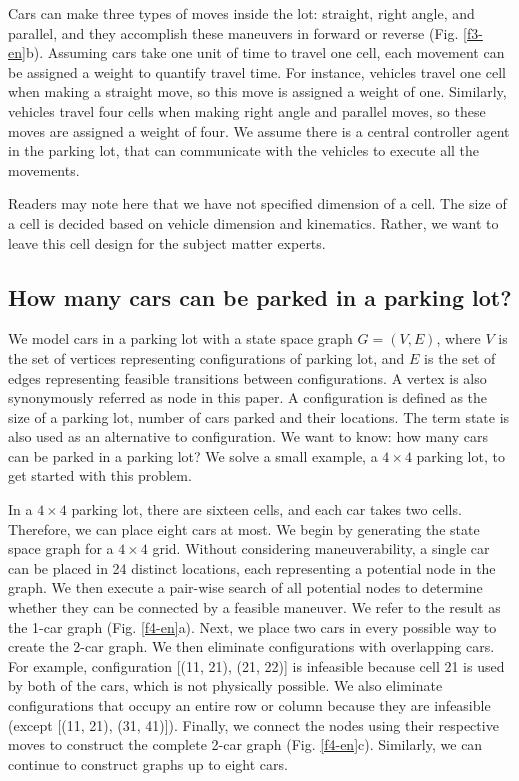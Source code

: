 Cars can make three types of moves inside the lot: straight, right angle, and parallel, and they accomplish these maneuvers in forward or reverse (Fig. \ref{f3-en}b). Assuming cars take one unit of time to travel one cell, each movement can be assigned a weight to quantify travel time. For instance, vehicles travel one cell when making a straight move, so this move is assigned a weight of one. Similarly, vehicles travel four cells when making right angle and parallel moves, so these moves are assigned a weight of four. We assume there is a central controller agent in the parking lot, that can communicate with the vehicles to execute all the movements.

Readers may note here that we have not specified dimension of a cell. The size of a cell is decided based on vehicle dimension and kinematics. Rather, we want to leave this cell design for the subject matter experts.

\subsection{How many cars can be parked in a parking lot?}

We model cars in a parking lot with a state space graph $G = (V, E)$, where $V$ is the set of vertices representing configurations of parking lot, and $E$ is the set of edges representing feasible transitions between configurations. A vertex is also synonymously referred as node in this paper. A configuration is defined as the size of a parking lot, number of cars parked and their locations. The term state is also used as an alternative to configuration. We want to know: how many cars can be parked in a parking lot? We solve a small example, a $4 \times 4$ parking lot, to get started with this problem.

In a $4 \times 4$ parking lot, there are sixteen cells, and each car takes two cells. Therefore, we can place eight cars at most. We begin by generating the state space graph for a $4 \times 4$ grid. Without considering maneuverability, a single car can be placed in 24 distinct locations, each representing a potential node in the graph. We then execute a pair-wise search of all potential nodes to determine whether they can be connected by a feasible maneuver. We refer to the result as the 1-car graph (Fig. \ref{f4-en}a). Next, we place two cars in every possible way to create the 2-car graph. We then eliminate configurations with overlapping cars. For example, configuration [(11, 21), (21, 22)] is infeasible because cell 21 is used by both of the cars, which is not physically possible. We also eliminate configurations that occupy an entire row or column because they are infeasible (except [(11, 21), (31, 41)]). Finally, we connect the nodes using their respective moves to construct the complete 2-car graph (Fig. \ref{f4-en}c). Similarly, we can continue to construct graphs up to eight cars.

